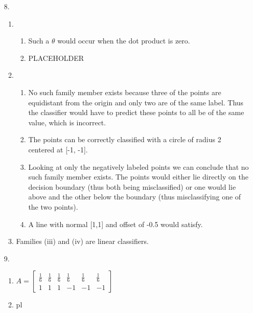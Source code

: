\documentclass{article}
\begin{document}
\begin{enumerate}
\item[8.]
	\begin{enumerate}
	\item
		\begin{enumerate}
		\item Such a $\theta$ would occur when the dot product is zero.
		\item PLACEHOLDER
		\end{enumerate}
	\item
		\begin{enumerate}
		\item 
			  No such family member exists because three of the points are equidistant from the origin and only two are of the same label. Thus the classifier would have to predict these points to all be of the same value, which is incorrect.
		\item 
			  The points can be correctly classified with a circle of radius 2 centered at [-1, -1].
		\item 
			  Looking at only the negatively labeled points we can conclude that no such family member exists. The points would either lie directly on the decision boundary (thus both being misclassified) or one would lie above and the other below the boundary (thus misclassifying one of the two points).
		\item 
			  A line with normal [1,1] and offset of -0.5 would satisfy.
		\end{enumerate}
	\item Families (iii) and (iv) are linear classifiers.
	\end{enumerate}

\bigskip

\item[9.]
	\begin{enumerate}
	\item
		  $A = \left[ \begin{smallmatrix} 
		       \frac{1}{6} & \frac{1}{6} & \frac{1}{6} & \frac{1}{6} & \frac{1}{6} & \frac{1}{6}\\
		                1  &          1  &          1  &         -1  &         -1  &         -1 \end{smallmatrix} \right]$
	\item pl
	\end{enumerate}

\bigskip


\end{enumerate}
\end{document}

